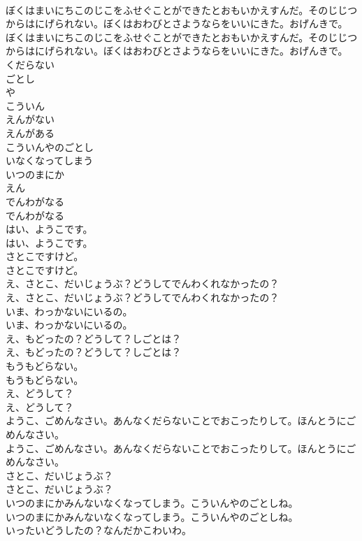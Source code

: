 \documentclass[8pt]{extreport}
\begin{document}
\begin{CJK}{UTF8}{min}
\\	ぼくはまいにちこのじこをふせぐことができたとおもいかえすんだ。そのじじつからはにげられない。ぼくはおわびとさようならをいいにきた。おげんきで。
\\	ぼくはまいにちこのじこをふせぐことができたとおもいかえすんだ。そのじじつからはにげられない。ぼくはおわびとさようならをいいにきた。おげんきで。
\\	くだらない
\\	ごとし
\\	や
\\	こういん
\\	えんがない
\\	えんがある
\\	こういんやのごとし
\\	いなくなってしまう
\\	いつのまにか
\\	えん
\\	でんわがなる
\\	でんわがなる
\\	はい、ようこです。
\\	はい、ようこです。
\\	さとこですけど。
\\	さとこですけど。
\\	え、さとこ、だいじょうぶ？どうしてでんわくれなかったの？
\\	え、さとこ、だいじょうぶ？どうしてでんわくれなかったの？
\\	いま、わっかないにいるの。
\\	いま、わっかないにいるの。
\\	え、もどったの？どうして？しごとは？
\\	え、もどったの？どうして？しごとは？
\\	もうもどらない。
\\	もうもどらない。
\\	え、どうして？
\\	え、どうして？
\\	ようこ、ごめんなさい。あんなくだらないことでおこったりして。ほんとうにごめんなさい。
\\	ようこ、ごめんなさい。あんなくだらないことでおこったりして。ほんとうにごめんなさい。
\\	さとこ、だいじょうぶ？
\\	さとこ、だいじょうぶ？
\\	いつのまにかみんないなくなってしまう。こういんやのごとしね。
\\	いつのまにかみんないなくなってしまう。こういんやのごとしね。
\\	いったいどうしたの？なんだかこわいわ。

\end{CJK}
\end{document}
